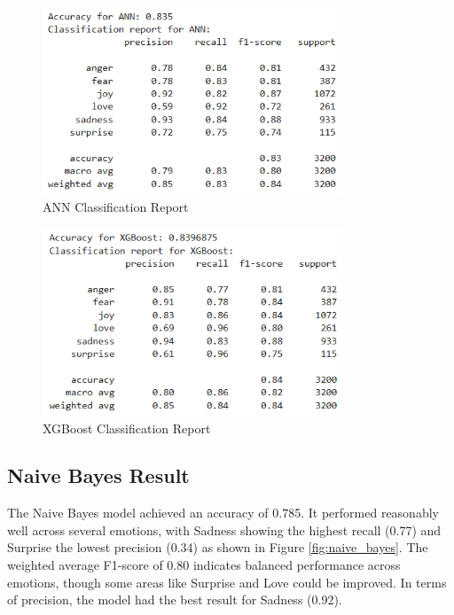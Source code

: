 \begin{figure}[h!]
\centering
\includegraphics[width=0.8\textwidth]{images/ann_result.png}
\caption{ANN Classification Report}
\label{fig:ann}
\end{figure}

\begin{figure}[h!]
\centering
\includegraphics[width=0.8\textwidth]{images/xgboost_result.png}
\caption{XGBoost Classification Report}
\label{fig:xgboost}
\end{figure}

\clearpage

\subsection{Naive Bayes Result}
The Naive Bayes model achieved an accuracy of 0.785. It performed reasonably well across several emotions, with Sadness showing the highest recall (0.77) and Surprise the lowest precision (0.34) as shown in Figure \ref{fig:naive_bayes}. The weighted average F1-score of 0.80 indicates balanced performance across emotions, though some areas like Surprise and Love could be improved. In terms of precision, the model had the best result for Sadness (0.92).

